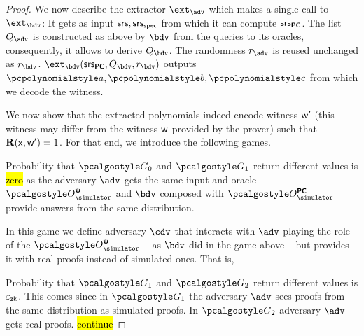 \documentclass[runningheads,11pt]{llncs}
\begin{document}
\begin{proof}
  We now describe the extractor $\ext_\adv$ which makes a single call to
  $\ext_{\bdv}$: It gets as input $\mathsf{srs}, \mathsf{srs_{spec}}$ from which it can compute
  $\mathsf{srs}_{{\bm{\mathsf{PC}}}}$. The list $\qadv$ is constructed as above by $\bdv$ from the
  queries to its oracles, consequently, it allows to derive $\qbdv$.  The
  randomness $\radv$ is reused unchanged as $\rbdv$.
  $\ext_{\bdv}(\srs_{\PCOM}, \qbdv, \rbdv)$ outputs $\p{a}, \p{b}, \p{c}$ from
  which we decode the witness.


  We now show that the extracted polynomials indeed encode witness $\mathsf{w}'$ (this
  witness may differ from the witness $\mathsf{w}$ provided by the prover) such that
  $\mathbf{R}(\mathsf{x}, \mathsf{w}') = 1$. For that end, we introduce the following games.

   Probability that $\game{0}$ and $\game{1}$
  return different values is \hl{zero} as the adversary $\adv$ gets the same
  input and oracle $\oraclesps$ and $\bdv$ composed with $\oraclespcom$ provide
  answers from the same distribution.
 
   In this game we define adversary $\cdv$ that interacts with
  $\adv$ playing the role of the $\oraclesps$ -- as $\bdv$ did in the game above
  -- but provides it with real proofs instead of simulated ones. That is,

  Probability that $\game{1}$ and $\game{2}$
  return different values is $\varepsilon_{\mathsf{zk}}$. This comes since in $\game{1}$ the
  adversary $\adv$ sees proofs from the same distribution as simulated
  proofs. In $\game{2}$ adversary $\adv$ gets real proofs.  \hl{continue}


\end{proof}
\end{document}
